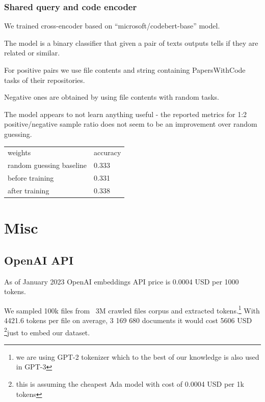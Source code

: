 \documentclass[longabstract,mgr,english]{iithesis}
\begin{document}
\subsection{Shared query and code encoder}

\label{shared_encoder}

We trained cross-encoder based on ``microsoft/codebert-base'' model. 

The model is a binary classifier that given a pair of texts outputs tells if
they are related or similar.

For positive pairs we use file contents and string containing PapersWithCode tasks of their repositories.

Negative ones are obtained by using file contents with random tasks.

The model appears to not learn anything useful - the reported metrics for 
1:2 positive/negative sample ratio does not seem to be an improvement over random guessing. 

\begin{center}
  \begin{tabular}{|l|l|}
    \toprule
    weights & accuracy \\
    random guessing baseline &     0.333 \\
    \hline
    before training &  0.331  \\
    \hline
    after training &     0.338  \\
    \bottomrule
  \end{tabular}
\end{center}

\chapter{Misc}

\label{OpenAI_API}
\section{OpenAI API}

As of January 2023 OpenAI embeddings API price is 0.0004 USD per 1000 tokens.

We sampled 100k files from ~3M crawled files corpus and extracted
tokens.\footnote{we are using GPT-2 tokenizer which to the best of our knowledge
  is also used in GPT-3}
With 4421.6 tokens per file on average, 3 169 680 documents it would cost 5606
USD \footnote{this is assuming the cheapest Ada model with cost of 0.0004 USD
  per 1k tokens}just to embed our dataset.
\end{document}
